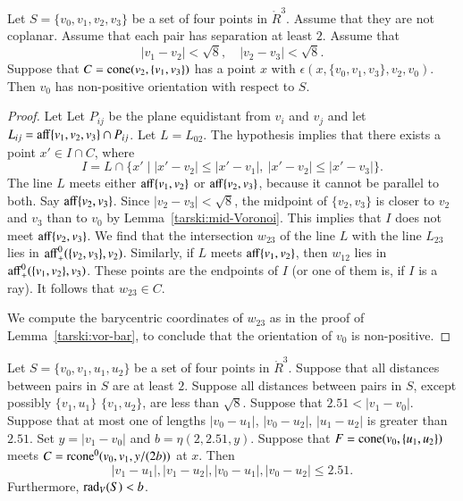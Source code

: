 \newpage

\begin{lemma}
Let $S=\{v_0,v_1,v_2,v_3\}$ be a set of four points in $\ring{R}^3$.
Assume that they are not coplanar.
Assume that each pair has separation at least $2$.
Assume that 
$$
|v_1-v_2|<\sqrt8,\quad  |v_2-v_3|<\sqrt8.
$$
Suppose that
$C={\operatorname{cone}}(v_2,\{v_1,v_3\})$ has a point $x$ with 
  $\epsilon(x,\{v_0,v_1,v_3\},v_2,v_0)$.    
Then $v_0$ has non-positive orientation with respect to $S$.
\end{lemma}



\begin{proof} 
Let Let $P_{ij}$ be the plane equidistant from $v_i$ and
$v_j$ and let $L_{ij} = {\operatorname{aff}}\{v_1,v_2,v_3\}\cap P_{ij}$.
Let $L=L_{02}$.
The hypothesis implies that there exists a point 
$x'\in I \cap C$, where
   $$I= L\cap \{x'\mid |x'-v_2|\le|x'-v_1|,\ |x'-v_2|\le |x'-v_3|\}.$$  
The line $L$ meets either ${\operatorname{aff}}\{v_1,v_2\}$ or ${\operatorname{aff}}\{v_2,v_3\}$,
because it cannot be parallel to both.  Say ${\operatorname{aff}}\{v_2,v_3\}$.
Since $|v_2-v_3|<\sqrt8$, the midpoint of $\{v_2,v_3\}$ is closer
to $v_2$ and $v_3$ than to $v_0$ by Lemma~\ref{tarski:mid-Voronoi}.
This implies that $I$ does not meet ${\operatorname{aff}}\{v_2,v_3\}$.
We find that the intersection $w_{23}$ of the line $L$ with
the line $L_{23}$ lies in ${\operatorname{aff}}_+^0(\{v_2,v_3\},v_2)$.  Similarly,
if $L$ meets ${\operatorname{aff}}\{v_1,v_2\}$, then $w_{12}$ lies in
${\operatorname{aff}}_+^0(\{v_1,v_2\},v_3)$.  These points are the endpoints of 
$I$ (or one of them is, if $I$ is a ray).  It follows that $w_{23}\in C$.

We compute the barycentric coordinates of $w_{23}$ as in the proof
of Lemma~\ref{tarski:vor-bar}, to conclude that the orientation
of $v_0$ is non-positive.
\end{proof}

\newpage

\begin{lemma}
 Let $S=\{v_0,v_1,u_1,u_2\}$ be a set of four points
in $\ring{R}^3$.
Suppose that all distances between pairs in $S$ are at least $2$.
Suppose all distances between pairs in $S$, except possibly $\{v_1,u_1\}$
$\{v_1,u_2\}$, are
less than $\sqrt8$. Suppose that $2.51 < |v_1-v_0|$.
Suppose that at most one of lengths $|v_0-u_1|$,
$|v_0-u_2|$, $|u_1-u_2|$ is greater than $2.51$.
%
Set $y=|v_1-v_0|$ and $b=\eta(2,2.51,y)$.
Suppose that $F={\operatorname{cone}}(v_0,\{u_1,u_2\})$ meets
$C={\operatorname{rcone}}^0(v_0,v_1,y/(2b))$ at $x$.
Then 
  $$
  |v_1-u_1|,|v_1-u_2|,|v_0-u_1|,|v_0-u_2|\le 2.51.
  $$
Furthermore, $\operatorname{rad}_V(S) < b$. 
\end{lemma}

